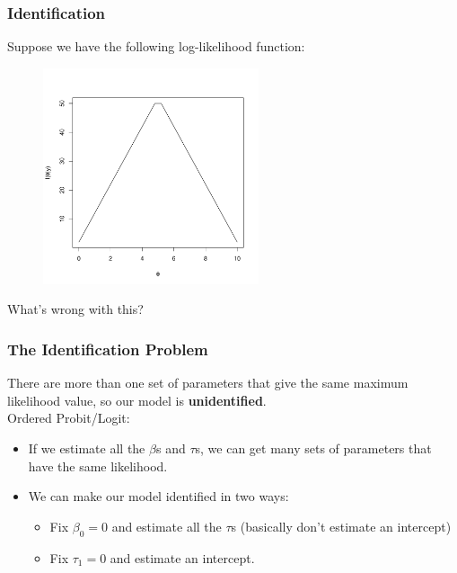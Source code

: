 \documentclass{beamer}
\begin{document}
\begin{frame}
\frametitle{Identification}
\pause
Suppose we have the following log-likelihood function:
\begin{figure}[!htp]
\begin{center}
\includegraphics[width=2.5in, height=2.5in]{logit-ident.pdf}
\end{center}
\end{figure}
\pause
What's wrong with this?
\end{frame}

\begin{frame}
\frametitle{The Identification Problem}
\pause
There are more than one set of parameters that give the same maximum
likelihood value, so our model is \textbf{unidentified}. \\
\pause
\bigskip
Ordered Probit/Logit:
\pause
\begin{itemize}
\item If we estimate all the $\beta$s and $\tau$s, we can get many
sets of parameters that have the same likelihood. 
\pause
\item We can make our model identified in two ways:
\pause
\begin{itemize}
\item Fix $\beta_0 = 0$ and estimate all the $\tau$s (basically don't estimate an intercept) 
\pause
\item Fix $\tau_1 = 0$ and estimate an intercept.
\end{itemize}
\end{itemize}
\end{frame}
\end{document}
